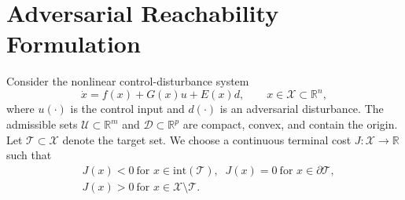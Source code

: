 \documentclass[letterpaper, 10 pt, conference]{ieeeconf}
\theoremstyle{plain}
\theoremstyle{definition}
\begin{document}
\section{Adversarial Reachability Formulation}

Consider the nonlinear control-disturbance system
\begin{equation}
    \dot x = f(x) + G(x)u + E(x)d,
    \qquad x \in \mathcal{X}\subset\mathbb{R}^n,
    \label{eq:system}
\end{equation}
where $u(\cdot)$ is the control input and $d(\cdot)$ is an adversarial disturbance.
The admissible sets $\mathcal{U}\subset\mathbb{R}^{m}$ and $\mathcal{D}\subset\mathbb{R}^{p}$ are compact, convex, and contain the origin. Let $\mathcal{T}\subset\mathcal{X}$ denote the target set.
We choose a continuous terminal cost $J:\mathcal{X}\to\mathbb{R}$ such that
\begin{align}
    &J(x)<0 \ \text{for } x\in\mathrm{int}(\mathcal{T}),\;\;
    J(x)=0 \ \text{for } x\in\partial\mathcal{T},\nonumber\\
    &J(x)>0 \ \text{for } x\in\mathcal{X}\setminus\mathcal{T}.
    \label{eq:terminal_cost_target}
\end{align}
\end{document}
